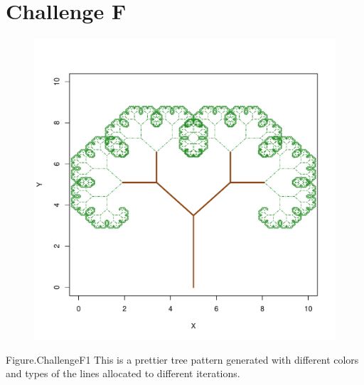 \documentclass[12pt,a4paper]{article}
\begin{document}
\section{Challenge F}
\begin{figure}[h]
\centering
\includegraphics[width=\textwidth]{challengeF1.pdf}
\end{figure}
Figure.ChallengeF1 This is a prettier tree pattern generated with different colors and types of the lines allocated to different iterations.
\\
\\
\\
\\
\\
\\
\\
\\
\\
\end{document}
